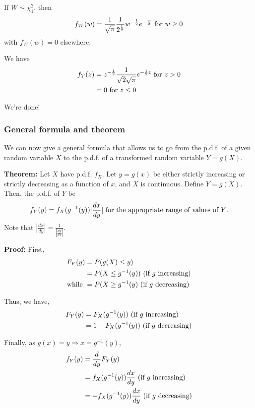 \documentclass[12pt]{article}
\begin{document}
If $W \sim \chi_1^2$, then
\[
    f_W (w) = \frac{1}{\sqrt{\pi}} \frac{1}{2^{\frac{1}{2}}} w^{-\frac{1}{2}} e^{-\frac{w}{2}} \textnormal{ for } w \geq 0
\]
with $f_W (w) = 0$ elsewhere.

We have
\begin{align*}
    f_Y (z) &= z^{-\frac{1}{2}} \frac{1}{\sqrt{2} \sqrt{\pi}} e^{-\frac{1}{2} z} \textnormal{ for } z > 0 \\
        &= 0 \textnormal{ for } z \leq 0
\end{align*}

We're done!

\subsubsection{General formula and theorem}
We can now give a general formula that allows us to go from the p.d.f. of a given random variable $X$ to the p.d.f. of a transformed random variable $Y = g(X)$.

\textbf{Theorem:} Let $X$ have p.d.f. $f_X$. Let $y = g(x)$ be either strictly increasing or strictly decreasing as a function of $x$, and $X$ is continuous. Define $Y = g(X)$. Then, the p.d.f. of $Y$ be
\[
    f_Y (y) = f_X (g^{-1} (y)) |\frac{dx}{dy}| \textnormal{ for the appropriate range of values of $Y$.}
\]
Note that $|\frac{dx}{dy}| = \frac{1}{|\frac{dy}{dx}|}$.

\textbf{Proof:} First, 
\begin{align*}
    F_Y (y) &= P(g(X) \leq y) \\
        &= P(X \leq g^{-1}(y)) \textnormal{ (if $g$ increasing)} \\
    \textnormal{while } &= P(X \geq g^{-1}(y) \textnormal{ (if $g$ decreasing)}
\end{align*}

Thus, we have,
\begin{align*}
    F_Y (y) &= F_X (g^{-1} (y)) \textnormal{ (if $g$ increasing)} \\
        &= 1 - F_X (g^{-1} (y)) \textnormal{ (if $g$ decreasing)} 
\end{align*}

Finally, as $g(x) = y \Rightarrow x = g^{-1} (y)$,
\begin{align*}
    f_Y (y) &= \frac{d}{dy} F_Y (y) \\
        &= f_X (g^{-1} (y)) \frac{dx}{dy} \textnormal{ (if $g$ increasing)} \\
        &= - f_X (g^{-1}(y)) \frac{dx}{dy} \textnormal{ (if $g$ decreasing)}
\end{align*}
\end{document}
